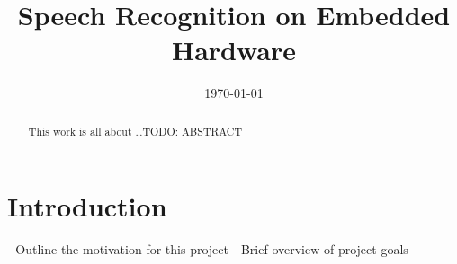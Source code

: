 \documentclass{ecsreport}     %
\begin{document}
\frontmatter
\title      {Speech Recognition on Embedded Hardware}
\addresses  {\groupname\\\deptname\\\univname}
\date       {\today}
\subject    {}
\keywords   {}
\maketitle
\begin{abstract}
This work is all about \dots TODO: ABSTRACT
\end{abstract}
\tableofcontents
\mainmatter

\chapter{Introduction} %
\label{cha:introduction}

- Outline the motivation for this project
- Brief overview of project goals











\appendix

\backmatter


\end{document}
